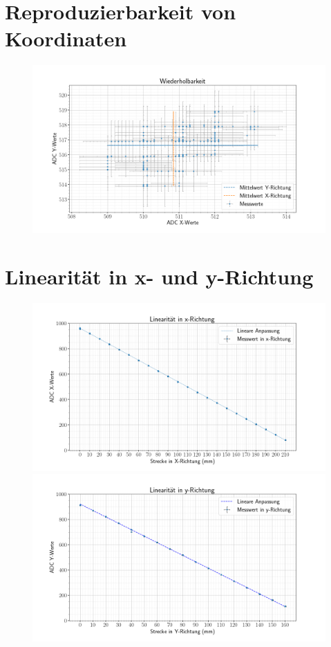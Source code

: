 \section{Reproduzierbarkeit von Koordinaten}
\label{ab:wiederholung}
\begin{figure}[ht!]
    \centering
    \includegraphics[width=\linewidth]{fig/wiederholung.png}
    \caption{}
    \label{fig:wiederhol}
\end{figure}
\section{Linearität in x- und y-Richtung}
\label{ab:linear}
\begin{figure}[ht!]
    \centering
    \includegraphics[width=\linewidth]{fig/8_linearitaet_x.png}
    \caption{}
    \label{fig:xlinear}
    \includegraphics[width=\linewidth]{fig/8_linearitaet_y.png}
    \caption{}
    \label{fig:ylinear}
\end{figure}